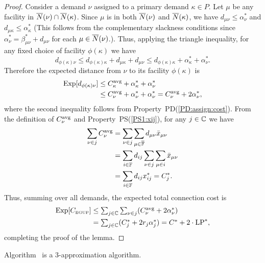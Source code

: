 \documentclass[11pt]{article}
\begin{document}
\begin{proof}
  Consider a demand $\nu$ assigned to a primary demand
  $\kappa\in P$. Let $\mu$ be any facility in ${\overline{N}}(\nu)
  \cap {\overline{N}}(\kappa)$.  Since $\mu$ is in both
  ${\overline{N}}(\nu)$ and ${\overline{N}}(\kappa)$, we have $d_{\mu\nu}
  \leq \alpha_{\nu}^\ast$ and $d_{\mu\kappa} \leq
  \alpha_{\kappa}^\ast$ (This follows from the complementary
  slackness conditions since
  $\alpha_{\nu}^\ast=\beta_{\mu\nu}^\ast + d_{\mu\nu}$ for
  each $\mu\in {\overline{N}}(\nu)$.). Thus, applying the triangle
  inequality, for any fixed choice of facility
  $\phi(\kappa)$ we have
%
\begin{equation*}
    d_{\phi(\kappa)\nu} \leq d_{\phi(\kappa)\kappa}+d_{\mu\kappa}+d_{\mu\nu}
    \leq d_{\phi(\kappa)\kappa} + \alpha_{\kappa}^\ast + \alpha_{\nu}^\ast.
\end{equation*}
%
Therefore the expected distance from $\nu$ to its facility $\phi(\kappa)$ is 
%
\begin{align*}
  \mbox{\rm Exp}[  d_{\phi(\kappa)\nu}   ] &\le C^{{\mbox{\scriptsize\rm avg}}}_{\kappa} + \alpha_{\kappa}^\ast + \alpha_{\nu}^\ast 
\\
  &\leq C^{{\mbox{\scriptsize\rm avg}}}_{\nu} + \alpha_{\nu}^\ast + \alpha_{\nu}^\ast
   = C^{{\mbox{\scriptsize\rm avg}}}_{\nu} + 2\alpha_{\nu}^\ast,
  \end{align*}
%
  where the second inequality follows from Property~PD(\ref{PD:assign:cost}).  
From the definition of $C^{{\mbox{\scriptsize\rm avg}}}_{\nu}$ and Property~PS(\ref{PS1:xij}), for any $j\in \mathbb{C}$ 
we have
%
\begin{align*}
\sum_{\nu\in j} C^{{\mbox{\scriptsize\rm avg}}}_{\nu} &= \sum_{\nu\in j}\sum_{\mu\in\overline{\mathbb{F}}}d_{\mu\nu}{\bar x}_{\mu\nu}
			\\
 			&= \sum_{i\in\mathbb{F}} d_{ij}\sum_{\nu\in j}\sum_{\mu\in i}{\bar x}_{\mu\nu}
			\\
			&= \sum_{i\in\mathbb{F}} d_{ij}x^\ast_{ij} 
			= C^\ast_j.
\end{align*}
% 
Thus, summing over all demands, the expected total connection cost is
%
\begin{align*}
    \mbox{\rm Exp}[C_{\mbox{\tiny\rm EGUP}}] &\le 
			\textstyle{\sum_{j\in\mathbb{C}} \sum_{\nu\in j}} (C^{{\mbox{\scriptsize\rm avg}}}_{\nu} + 2\alpha_{\nu}^\ast) 
			\\
    	& = \textstyle{\sum_{j\in\mathbb{C}}} (C_j^\ast + 2r_j\alpha_j^\ast)
 		= C^\ast + 2\cdot\mbox{\rm LP}^\ast,
\end{align*}
%
completing the proof of the lemma.
\end{proof}


\begin{theorem}
Algorithm~{\EGUP} is a $3$-approximation algorithm.
\end{theorem}
\end{document}
